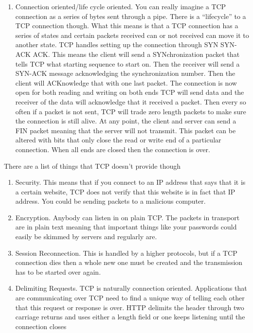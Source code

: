 \begin{enumerate}
\item Connection oriented/life cycle oriented.
  You can really imagine a TCP connection as a series of bytes sent through a pipe.
  There is a ``lifecycle'' to a TCP connection though. What this means is that a TCP connection has a series of states and certain packets received can or not received can move it to another state.
  TCP handles setting up the connection through SYN SYN-ACK ACK. This means the client will send a SYNchronization packet that tells TCP what starting sequence to start on. Then the receiver will send a SYN-ACK message acknowledging the synchronization number.
  Then the client will ACKnowledge that with one last packet.
  The connection is now open for both reading and writing on both ends
  TCP will send data and the receiver of the data will acknowledge that it received a packet.
  Then every so often if a packet is not sent, TCP will trade zero length packets to make sure the connection is still alive.
  At any point, the client and server can send a FIN packet meaning that the server will not transmit.
  This packet can be altered with bits that only close the read or write end of a particular connection. When all ends are closed then the connection is over.
\end{enumerate}

There are a list of things that TCP doesn't provide though

\begin{enumerate}
\item Security.
  This means that if you connect to an IP address that says that it is a certain website, TCP does not verify that this website is in fact that IP address.
  You could be sending packets to a malicious computer.
\item Encryption.
  Anybody can listen in on plain TCP.
  The packets in transport are in plain text meaning that important things like your passwords could easily be skimmed by servers and regularly are.
\item Session Reconnection.
  This is handled by a higher protocols, but if a TCP connection dies then a whole new one must be created and the transmission has to be started over again.
\item Delimiting Requests.
  TCP is naturally connection oriented.
  Applications that are communicating over TCP need to find a unique way of telling each other that this request or response is over.
  HTTP delimits the header through two carriage returns and uses either a length field or one keeps listening until the connection closes
\end{enumerate}

